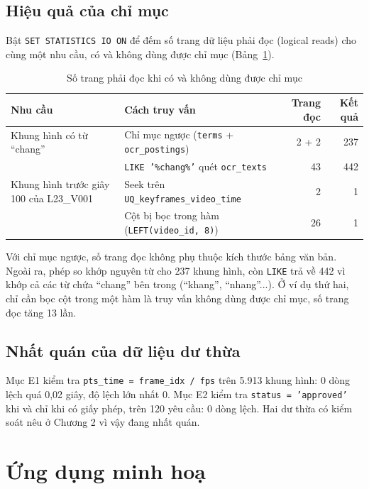 \subsection{Hiệu quả của chỉ mục}

Bật \texttt{SET STATISTICS IO ON} để đếm số trang dữ liệu phải đọc (logical reads) cho cùng
một nhu cầu, có và không dùng được chỉ mục (Bảng~\ref{tab:index_test}).

\begin{table}[H]
\centering
\caption{Số trang phải đọc khi có và không dùng được chỉ mục}
\label{tab:index_test}
\renewcommand{\arraystretch}{1.15}
\small
\begin{tabularx}{\textwidth}{>{\raggedright\arraybackslash}X >{\raggedright\arraybackslash}p{5.2cm} r r}
\toprule
\textbf{Nhu cầu} & \textbf{Cách truy vấn} & \textbf{Trang đọc} & \textbf{Kết quả} \\
\midrule
Khung hình có từ ``chang'' & Chỉ mục ngược (\texttt{terms} + \texttt{ocr\_postings}) & 2 + 2 & 237 \\
 & \texttt{LIKE '\%chang\%'} quét \texttt{ocr\_texts} & 43 & 442 \\
\addlinespace
Khung hình trước giây 100 của L23\_V001 & Seek trên \texttt{UQ\_keyframes\_video\_time} & 2 & 1 \\
 & Cột bị bọc trong hàm (\texttt{LEFT(video\_id, 8)}) & 26 & 1 \\
\bottomrule
\end{tabularx}
\end{table}

Với chỉ mục ngược, số trang đọc không phụ thuộc kích thước bảng văn bản. Ngoài ra, phép so
khớp nguyên từ cho 237 khung hình, còn \texttt{LIKE} trả về 442 vì khớp cả các từ chứa
``chang'' bên trong (``khang'', ``nhang''...). Ở ví dụ thứ hai, chỉ cần bọc cột trong một
hàm là truy vấn không dùng được chỉ mục, số trang đọc tăng 13 lần.

\subsection{Nhất quán của dữ liệu dư thừa}

Mục E1 kiểm tra \texttt{pts\_time = frame\_idx / fps} trên 5.913 khung hình: 0 dòng lệch quá
0,02 giây, độ lệch lớn nhất 0. Mục E2 kiểm tra \texttt{status = 'approved'} khi và chỉ khi
có giấy phép, trên 120 yêu cầu: 0 dòng lệch. Hai dư thừa có kiểm soát nêu ở Chương 2 vì vậy
đang nhất quán.

\section{Ứng dụng minh hoạ}

